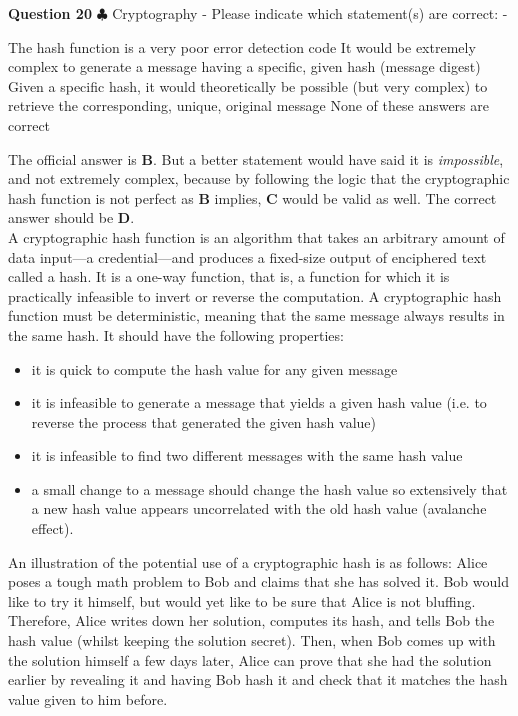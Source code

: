\documentclass[en]{sourcefiles/eplexam}
\newcounter{choice}
\renewcommand\thechoice{\textbf{\Alph{choice}}}
\newcommand\choicelabel{\thechoice$\quad$}
\newenvironment{choices}%
  {\list{\choicelabel}%
     {\usecounter{choice}\def\makelabel##1{\hss\llap{##1}}%
       \settowidth{\leftmargin}{W.\hskip\labelsep\hskip 2.5em}%
       \def\choice{%
         \item
       } %
       \labelwidth\leftmargin\advance\labelwidth-\labelsep
       \topsep=0pt
       \partopsep=0pt
     }%
  }%
  {\endlist}
\begin{document}
\textbf{Question 20} $\clubsuit$ Cryptography - Please indicate which statement(s) are correct:
\begin{choices}
    \choice The hash function is a very poor error detection code
    \choice It would be extremely complex to generate a message having a specific, given hash (message digest)
    \choice Given a specific hash, it would theoretically be possible (but very complex) to retrieve the corresponding, unique, original message
     \choice None of these answers are correct
\end{choices}
\begin{solution}
The official answer is \textbf{B}. But a better statement would have said it is \textit{impossible}, and not extremely complex, because by following the logic that the cryptographic hash function is not perfect as \textbf{B} implies, \textbf{C} would be valid as well. The correct answer should be \textbf{D}.\\

\noindent A cryptographic hash function is an algorithm that takes an arbitrary amount of data input—a credential—and produces a fixed-size output of enciphered text called a hash. It is a one-way function, that is, a function for which it is practically infeasible to invert or reverse the computation. A cryptographic hash function must be deterministic, meaning that the same message always results in the same hash. It should have the following properties:
\begin{itemize}
    \item it is quick to compute the hash value for any given message
    \item it is infeasible to generate a message that yields a given hash value (i.e. to reverse the process that generated the given hash value)
    \item it is infeasible to find two different messages with the same hash value
    \item a small change to a message should change the hash value so extensively that a new hash value appears uncorrelated with the old hash value (avalanche effect).
\end{itemize}
An illustration of the potential use of a cryptographic hash is as follows: Alice poses a tough math problem to Bob and claims that she has solved it. Bob would like to try it himself, but would yet like to be sure that Alice is not bluffing. Therefore, Alice writes down her solution, computes its hash, and tells Bob the hash value (whilst keeping the solution secret). Then, when Bob comes up with the solution himself a few days later, Alice can prove that she had the solution earlier by revealing it and having Bob hash it and check that it matches the hash value given to him before.

\end{solution}
\end{document}
